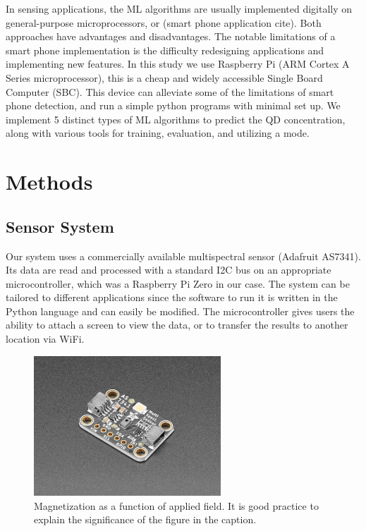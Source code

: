 \documentclass[journal,twoside,web]{ieeecolor}
\begin{document}
In sensing applications, the ML algorithms are usually implemented digitally on general-purpose microprocessors\cite{Shirmohammadli2021}, or (smart phone application cite). Both approaches have advantages and disadvantages. The notable limitations of a smart phone implementation is the difficulty redesigning applications and implementing new features. In this study we use Raspberry Pi (ARM Cortex A Series microprocessor), this is a cheap and widely accessible Single Board Computer (SBC). This device can alleviate some of the limitations of smart phone detection, and run a simple python programs with minimal set up.  We implement 5 distinct types of ML algorithms to predict the QD concentration, along with various tools for training, evaluation, and utilizing a mode. 
\\

\section{Methods}

\subsection{Sensor System}
Our system uses a commercially available multispectral sensor (Adafruit AS7341). Its data are read and processed with a standard I2C bus on an appropriate microcontroller, which was a Raspberry Pi Zero in our case. The system can be tailored to different applications since the software to run it is written in the Python language and can easily be modified. The microcontroller gives users the ability to attach a screen to view the data, or to transfer the results to another location via WiFi.
\begin{figure}[!t]
\centerline{\includegraphics[width=7cm]{469800.jpg}}
\caption{Magnetization as a function of applied field.
It is good practice to explain the significance of the figure in the caption.}
\label{fig3}
\end{figure}
\end{document}
